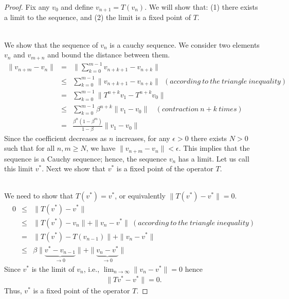 \begin{proof}
Fix any $v_0$ and define $v_{n+1}=T(v_n)$. We will show that: (1)
there exists a limit to the sequence, and (2) the limit is a fixed
point of $T$.

\bigskip
{}\\
We show that the sequence of $v_n$ is a cauchy sequence. We consider
two elements $v_n$ and $v_{m+n}$ and bound the distance between them.
\begin{eqnarray*}
\|v_{n+m}-v_n\| & = & \|\sum_{k=0}^{m-1}v_{n+k+1}-v_{n+k}\|\\
& \leq & \sum_{k=0}^{m-1}\|v_{n+k+1}-v_{n+k}\| \ \ (according\ to\
the\ triangle\ inequality)\\& = &
\sum_{k=0}^{m-1}\|T^{n+k}v_1-T^{n+k}v_0\|\\ & \leq &
\sum_{k=0}^{m-1}\beta^{n+k}\|v_1-v_0\|\ \ \ \ (contraction\ n+k\
times)\\& = & \frac{\beta^n(1-\beta^m)}{1-\beta}\|v_1-v_0\|
\end{eqnarray*}
Since the coefficient decreases as $n$ increases, for any $ \epsilon
> 0$ there exists   $N
> 0$  such that for all $ n,m \geq N$, we have $\|v_{n+m}-v_n\| <
\epsilon$. This implies that the sequence is a Cauchy sequence;
hence, the sequence $v_n$ has a limit. Let us call this limit
${v^*}$. Next we show that ${v^*}$ is a fixed point of the operator
$T$.

\bigskip
{}\\
We need to show that $T(v^*)=v^*$, or equivalently
$\|T(v^*)-v^*\|=0$.
\begin{eqnarray*}
0 & \leq & \|T(v^*)-v^*\|\\
& \leq & \|T(v^*)-v_n\|  +  \|v_n-v^*\|\ (according\ to\ the \
triangle\ inequality)\\
& = & \|T(v^*)-T(v_{n-1})\|  +  \|v_n-v^*\|\\
& \leq & \beta\|\underbrace{v^*-v_{n-1}}_{\rightarrow 0 }\|  +
\|\underbrace{v_{n}-v^*}_{\rightarrow 0}\|
\end{eqnarray*}
Since $v^*$ is the limit of $v_n$, i.e.,
$\lim_{n\rightarrow\infty}\|v_n-v^*\| = 0 $ hence
\begin{eqnarray*}
\|T v^*- v^*\| = 0.
\end{eqnarray*}
Thus, $v^*$ is a fixed point of the operator $T$.


\end{proof}
